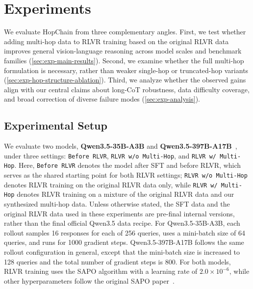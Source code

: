 \section{Experiments}
\label{sec:experiments}

\newcommand{\MethodOne}{\shortstack[c]{Before RLVR}}
\newcommand{\MethodTwo}{\shortstack[c]{RLVR w/o Multi-Hop}}
\newcommand{\MethodThree}{\shortstack[c]{RLVR w/ Multi-Hop}}
\newlength{\BenchmarkColWidth}
\newlength{\ResultColWidth}
\setlength{\BenchmarkColWidth}{0.18\linewidth}
\setlength{\ResultColWidth}{\dimexpr(\linewidth-\BenchmarkColWidth)/3\relax}
\newcommand{\ExperimentHeaderRow}{%
\multicolumn{4}{@{}l@{}}{%
  \begingroup
  \setlength{\fboxsep}{0pt}%
  \colorbox{black!5}{%
    \parbox{\linewidth}{%
      \strut
      \makebox[\BenchmarkColWidth][l]{Benchmark}%
      \makebox[\ResultColWidth][c]{\MethodOne}%
      \makebox[\ResultColWidth][c]{\MethodTwo}%
      \makebox[\ResultColWidth][c]{\MethodThree}%
      \strut
    }%
  }%
  \endgroup
}%
\\}


We evaluate HopChain from three complementary angles.
First, we test whether adding multi-hop data to RLVR training based on the original RLVR data improves general vision-language reasoning across model scales and benchmark families (\cref{sec:exp-main-results}).
Second, we examine whether the full multi-hop formulation is necessary, rather than weaker single-hop or truncated-hop variants (\cref{sec:exp-hop-structure-ablation}).
Third, we analyze whether the observed gains align with our central claims about long-CoT robustness, data difficulty coverage, and broad correction of diverse failure modes (\cref{sec:exp-analysis}).

\subsection{Experimental Setup}
We evaluate two models, \textbf{Qwen3.5-35B-A3B} and \textbf{Qwen3.5-397B-A17B}~, under three settings: \texttt{Before RLVR}, \texttt{RLVR w/o Multi-Hop}, and \texttt{RLVR w/ Multi-Hop}.
Here, \texttt{Before RLVR} denotes the model after SFT and before RLVR, which serves as the shared starting point for both RLVR settings; \texttt{RLVR w/o Multi-Hop} denotes RLVR training on the original RLVR data only, while \texttt{RLVR w/ Multi-Hop} denotes RLVR training on a mixture of the original RLVR data and our synthesized multi-hop data.
Unless otherwise stated, the SFT data and the original RLVR data used in these experiments are pre-final internal versions, rather than the final official Qwen3.5 data recipe.
For Qwen3.5-35B-A3B, each rollout samples 16 responses for each of 256 queries, uses a mini-batch size of 64 queries, and runs for 1000 gradient steps.
Qwen3.5-397B-A17B follows the same rollout configuration in general, except that the mini-batch size is increased to 128 queries and the total number of gradient steps is 800.
For both models, RLVR training uses the SAPO algorithm with a learning rate of $2.0 \times 10^{-6}$, while other hyperparameters follow the original SAPO paper~.




